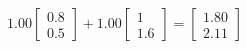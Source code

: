 \documentclass[preview]{standalone}
\begin{document}
\begin{align*}
1.00 \begin{bmatrix} 0.8 \\ 0.5 \end{bmatrix} + 1.00 \begin{bmatrix} 1 \\ 1.6 \end{bmatrix} = \begin{bmatrix} 1.80 \\ 2.11 \end{bmatrix}
\end{align*}
\end{document}
